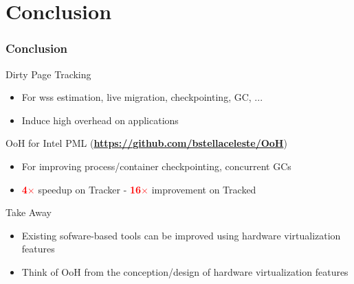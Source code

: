 \documentclass[xcolor=table,bigger,unknownkeysallowed]{beamer}
\newcommand{\myemph}[1]{\textcolor{red}{\bf #1}}
\begin{document}
\section{Conclusion}
\begin{frame}
\thispagestyle{empty}
\frametitle{Conclusion} 
	Dirty Page Tracking
	\begin{itemize}
		\item For wss estimation, live migration, checkpointing, GC, ...
		\item Induce high overhead on applications
	\end{itemize}
	\vspace*{.5cm}
	\pause
	OoH for Intel PML (\textcolor{blue}{\bf \url{https://github.com/bstellaceleste/OoH}})
	\begin{itemize}
		\item For improving process/container checkpointing, concurrent GCs
		\item \myemph{4$\times$} speedup on Tracker - \myemph{16$\times$} improvement on Tracked
	\end{itemize}
	\vspace*{.5cm}
	\pause
	Take Away
	\begin{itemize}
		\item Existing sofware-based tools can be improved using hardware virtualization features
		\item Think of OoH from the conception/design of hardware virtualization features
	\end{itemize}					
\end{frame}                       
\end{document}
